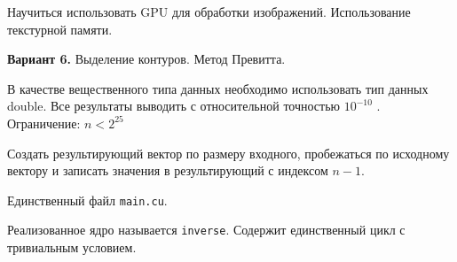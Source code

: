 \documentclass[12pt]{article}
\begin{document}


Научиться использовать GPU для обработки изображений.
Использование текстурной памяти.

\textbf{Вариант 6.} Выделение контуров. Метод Превитта.

В качестве вещественного типа данных необходимо использовать тип данных
double. Все результаты выводить с относительной точностью $10^{-10}$ . Ограничение:
$n < 2^{25}$

\nvidia

Создать результирующий вектор по размеру входного, пробежаться по исходному вектору
и записать значения в результирующий с индексом $n-1$.

Единственный файл \lstinline|main.cu|.

Реализованное ядро называется \lstinline|inverse|. Содержит единственный цикл с тривиальным условием.


\newpage

\end{document}
